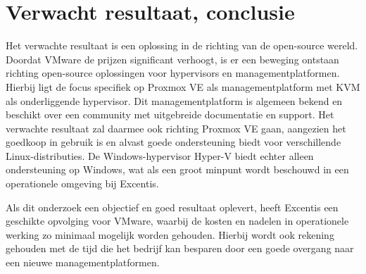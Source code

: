 


\section{Verwacht resultaat, conclusie}%
\label{sec:verwachte_resultaten}

Het verwachte resultaat is een oplossing in de richting van de open-source wereld. Doordat VMware de prijzen significant verhoogt, is er een beweging ontstaan richting open-source oplossingen voor hypervisors en managementplatformen.
Hierbij ligt de focus specifiek op Proxmox VE als managementplatform met KVM als onderliggende hypervisor. Dit managementplatform is algemeen bekend en beschikt over een community met uitgebreide documentatie en support.
Het verwachte resultaat zal daarmee ook richting Proxmox VE gaan, aangezien het goedkoop in gebruik is en alvast goede ondersteuning biedt voor verschillende Linux-distributies.
De Windows-hypervisor Hyper-V biedt echter alleen ondersteuning op Windows, wat als een groot minpunt wordt beschouwd in een operationele omgeving bij Excentis.

Als dit onderzoek een objectief en goed resultaat oplevert, heeft Excentis een geschikte opvolging voor VMware, waarbij de kosten en nadelen in operationele werking zo minimaal mogelijk worden gehouden.
Hierbij wordt ook rekening gehouden met de tijd die het bedrijf kan besparen door een goede overgang naar een nieuwe managementplatformen.



